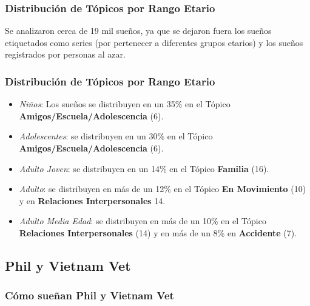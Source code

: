 \documentclass{beamer}
\begin{document}
\begin{frame}
\frametitle{Distribución de Tópicos por Rango Etario}
Se analizaron cerca de 19 mil sueños, ya que se dejaron fuera los sueños etiquetados como series (por pertenecer a diferentes grupos etarios) y los sueños registrados por personas al azar.\\
\end{frame}

\begin{frame}
\frametitle{Distribución de Tópicos por Rango Etario}
\begin{itemize}
[triangle]
        \item \textit{Niños}: Los sueños se distribuyen en un 35\% en el Tópico \textbf{Amigos/Escuela/Adolescencia} (6).
        \item \textit{Adolescentes}: se distribuyen en un 30\% en el Tópico \textbf{Amigos/Escuela/Adolescencia} (6).
        \item \textit{Adulto Joven}: se distribuyen en un 14\% en el Tópico \textbf{Familia} (16).
        \item \textit{Adulto}: se distribuyen en más de un 12\% en el Tópico \textbf{En Movimiento} (10) y en \textbf{Relaciones Interpersonales} 14.
        \item \textit{Adulto Media Edad}: se distribuyen en más de un 10\% en el Tópico \textbf{Relaciones Interpersonales} (14) y en más de un 8\% en \textbf{Accidente} (7).
\end{itemize}
\end{frame}

\subsection{Phil y Vietnam Vet}

\begin{frame}
\frametitle{Cómo sueñan Phil y Vietnam Vet}
\end{frame}
\end{document}
